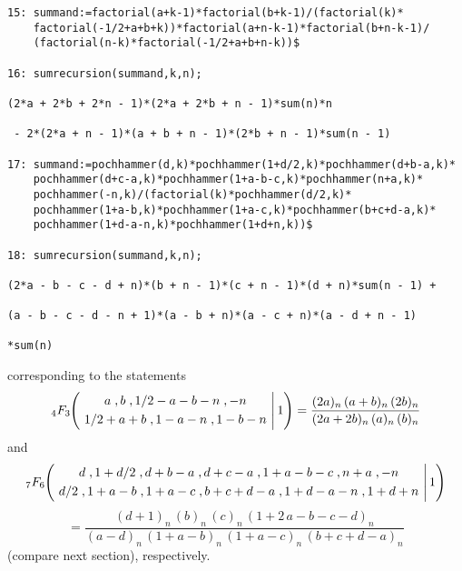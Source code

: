 {\small
\begin{verbatim}
15: summand:=factorial(a+k-1)*factorial(b+k-1)/(factorial(k)*
    factorial(-1/2+a+b+k))*factorial(a+n-k-1)*factorial(b+n-k-1)/
    (factorial(n-k)*factorial(-1/2+a+b+n-k))$

16: sumrecursion(summand,k,n);

(2*a + 2*b + 2*n - 1)*(2*a + 2*b + n - 1)*sum(n)*n

 - 2*(2*a + n - 1)*(a + b + n - 1)*(2*b + n - 1)*sum(n - 1)

17: summand:=pochhammer(d,k)*pochhammer(1+d/2,k)*pochhammer(d+b-a,k)*
    pochhammer(d+c-a,k)*pochhammer(1+a-b-c,k)*pochhammer(n+a,k)*
    pochhammer(-n,k)/(factorial(k)*pochhammer(d/2,k)*
    pochhammer(1+a-b,k)*pochhammer(1+a-c,k)*pochhammer(b+c+d-a,k)*
    pochhammer(1+d-a-n,k)*pochhammer(1+d+n,k))$

18: sumrecursion(summand,k,n);

(2*a - b - c - d + n)*(b + n - 1)*(c + n - 1)*(d + n)*sum(n - 1) + 

(a - b - c - d - n + 1)*(a - b + n)*(a - c + n)*(a - d + n - 1)

*sum(n)
\end{verbatim}
}\noindent
corresponding to the statements
\[
_4 F_3\left.
\!\!
\left(
\!\!\!\!
\begin{array}{c}
\multicolumn{1}{c}{\begin{array}{c}
a\;, b\;, 1/2-a-b-n\;, -n
\end{array}}\\[1mm]
\multicolumn{1}{c}{\begin{array}{c}
1/2+a+b \;, 1-a-n\;, 1-b-n
            \end{array}}\end{array}
\!\!\!\!
\right| 1\right)
=\frac{(2a)_n\,(a+b)_n\,(2b)_n}
{(2a+2b)_n\,(a)_n\,(b)_n}
\]
and
\[
_7 F_6\left.
\!\!
\left(
\!\!\!\!
\begin{array}{c}
\multicolumn{1}{c}{\begin{array}{c} 
d\;, 1+d/2\;, d+b-a\;, d+c-a\;, 1+a-b-c\;, n+a\;, -n 
\end{array}}\\[1mm]
\multicolumn{1}{c}{\begin{array}{c} 
 d/2\;, 1+a-b\;, 1+a-c\;, b+c+d-a \;, 1+d-a-n\;, 1+d+n
            \end{array}}\end{array}
\!\!\!\!
\right| 1\right)
\]
\[
=\frac{(d+1)_n\,(b)_n\,(c)_n\,(1+2\,a-b-c-d)_n}
{(a-d)_n\,(1+a-b)_n\,(1+a-c)_n\,(b+c+d-a)_n}
\]
(compare next section), respectively.


